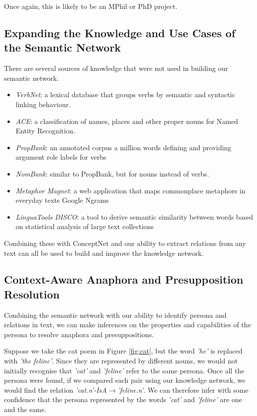 Once again, this is likely to be an MPhil or PhD project.

\subsection{Expanding the Knowledge and Use Cases of the Semantic Network}
There are several sources of knowledge that were not used in building our semantic network.

\begin{itemize}
\item{\textit{VerbNet}: a lexical database that groups verbs by semantic and syntactic linking behaviour.\cite{schuler2005verbnet}}
\item{\textit{ACE}: a classification of names, places and other proper nouns for Named Entity Recognition.\cite{doddington2004automatic}}
\item{\textit{PropBank}: an annotated corpus a million words defining and providing argument role labels for verbs\cite{kingsbury2002treebank}}
\item{\textit{NomBank}: similar to PropBank, but for nouns instead of verbs.\cite{meyers2004nombank}}
\item{\textit{Metaphor Magnet}: a web application that maps commonplace metaphors in everyday texts\cite{vealespecifying}}
Google Ngrams
\item{\textit{LinguaTools DISCO}: a tool to derive semantic similarity between words based on statistical analysis of large text collections\cite{kolb2008disco}}
\end{itemize}

Combining these with ConceptNet and our ability to extract relations from any text can all be used to build and improve the knowledge network.

\subsection{Context-Aware Anaphora and Presupposition Resolution}

Combining the semantic network with our ability to identify persona and relations in text, we can make inferences on the properties and capabilities of the persona to resolve anaphora and presuppositions.

Suppose we take the cat poem in Figure \ref{fig:cat}, but the word \textit{'he'} is replaced with \textit{'the feline'}. Since they are represented by different nouns, we would not initially recognise that \textit{'cat'} and \textit{'feline'} refer to the same persona. Once all the persona were found, if we compared each pair using our knowledge network, we would find the relation \textit{'cat.n'-IsA$\rightarrow$'feline.n'}. We can therefore infer with some confidence that the persona represented by the words \textit{'cat'} and \textit{'feline'} are one and the same.

